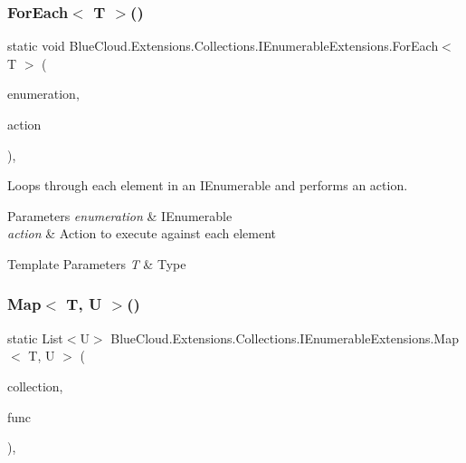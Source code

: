 \subsubsection{\texorpdfstring{For\+Each$<$ T $>$()}{ForEach< T >()}}
{\footnotesize\ttfamily static void Blue\+Cloud.\+Extensions.\+Collections.\+I\+Enumerable\+Extensions.\+For\+Each$<$ T $>$ (\begin{DoxyParamCaption}\item[{this I\+Enumerable$<$ T $>$}]{enumeration,  }\item[{Action$<$ T $>$}]{action }\end{DoxyParamCaption})\hspace{0.3cm}{\ttfamily [inline]}, {\ttfamily [static]}}



Loops through each element in an I\+Enumerable and performs an action. 


\begin{DoxyParams}{Parameters}
{\em enumeration} & I\+Enumerable\\
\hline
{\em action} & Action to execute against each element\\
\hline
\end{DoxyParams}

\begin{DoxyTemplParams}{Template Parameters}
{\em T} & Type\\
\hline
\end{DoxyTemplParams}
\mbox{\label{class_blue_cloud_1_1_extensions_1_1_collections_1_1_i_enumerable_extensions_aa66be5444752af92c1b9e672f08cb73f}} 
\subsubsection{\texorpdfstring{Map$<$ T, U $>$()}{Map< T, U >()}}
{\footnotesize\ttfamily static List$<$U$>$ Blue\+Cloud.\+Extensions.\+Collections.\+I\+Enumerable\+Extensions.\+Map$<$ T, U $>$ (\begin{DoxyParamCaption}\item[{this I\+Enumerable$<$ T $>$}]{collection,  }\item[{Func$<$ T, U $>$}]{func }\end{DoxyParamCaption})\hspace{0.3cm}{\ttfamily [inline]}, {\ttfamily [static]}}



